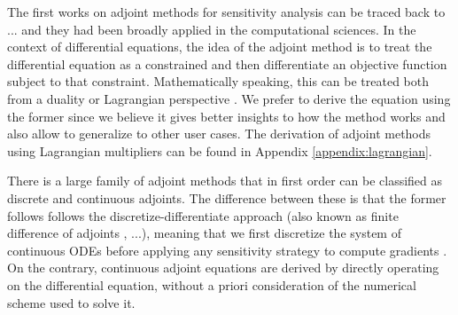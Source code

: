 The first works on adjoint methods for sensitivity analysis can be traced back to ... and they had been broadly applied in the computational sciences. 
In the context of differential equations, the idea of the adjoint method is to treat the differential equation as a constrained and then differentiate an objective function subject to that constraint. 
Mathematically speaking, this can be treated both from a duality or Lagrangian perspective \cite{Giles_Pierce_2000}.
We prefer to derive the equation using the former since we believe it gives better insights to how the method works and also allow to generalize to other user cases. 
The derivation of adjoint methods using Lagrangian multipliers can be found in Appendix \ref{appendix:lagrangian}.

There is a large family of adjoint methods that in first order can be classified as discrete and continuous adjoints. 
The difference between these is that the former follows follows the discretize-differentiate approach (also known as finite difference of adjoints \cite{Sirkes_Tziperman_1997}, ...), meaning that we first discretize the system of continuous ODEs before applying any sensitivity strategy to compute gradients \cite{Giles_Pierce_2000, allaire2015review}. 
On the contrary, continuous adjoint equations are derived by directly operating on the differential equation, without a priori consideration of the numerical scheme used to solve it. 
